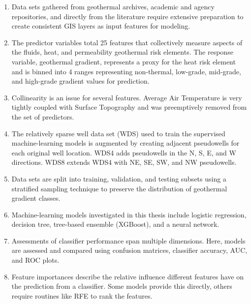 \begin{enumerate}
    \item Data sets gathered from geothermal archives, academic and agency repositories, and directly from the literature require extensive preparation to create consistent GIS layers as input features for modeling.
    \item The predictor variables total 25 features that collectively measure aspects of the fluids, heat, and permeability geothermal risk elements.  The response variable, geothermal gradient, represents a proxy for the heat risk element and is binned into 4 ranges representing non-thermal, low-grade, mid-grade, and high-grade gradient values for prediction.
    \item Collinearity is an issue for several features. Average Air Temperature is very tightly coupled with Surface Topography and was preemptively removed from the set of predictors.
    \item The relatively sparse well data set (WDS) used to train the supervised machine-learning models is augmented by creating adjacent pseudowells for each original well location. WDS4 adds pseudowells in the N, S, E, and W directions. WDS8 extends WDS4 with NE, SE, SW, and NW pseudowells.
    \item Data sets are split into training, validation, and testing subsets using a stratified sampling technique to preserve the distribution of geothermal gradient classes.
    \item Machine-learning models investigated in this thesis include logistic regression, decision tree, tree-based ensemble (XGBoost), and a neural network.
    \item Assessments of classifier performance span multiple dimensions. Here, models are assessed and compared using confusion matrices, classifier accuracy, AUC, and ROC plots.
    \item Feature importances describe the relative influence different features have on the prediction from a classifier. Some models provide this directly, others require routines like RFE to rank the features.

\end{enumerate}
